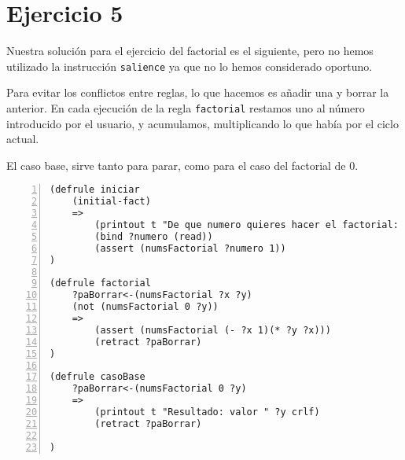\documentclass[12pt]{article}
\begin{document}
\section{Ejercicio 5}
Nuestra soluci\'{o}n para el ejercicio del factorial es el siguiente, pero
no hemos utilizado la instrucci\'{o}n \texttt{salience} ya que no lo hemos
considerado oportuno. 

Para evitar los conflictos entre reglas, lo que hacemos
es a\~{n}adir una y borrar la anterior. En cada ejecuci\'{o}n de la regla
\texttt{factorial} restamos uno al n\'{u}mero introducido por el usuario, y 
acumulamos, multiplicando lo que hab\'{i}a por el ciclo actual.

El caso base, sirve tanto para parar, como para el caso del factorial de 0.
\begin{lstlisting}[breaklines=true, 
numbers=left, showspaces=false]
(defrule iniciar
    (initial-fact)
    =>
        (printout t "De que numero quieres hacer el factorial: ")
        (bind ?numero (read))
        (assert (numsFactorial ?numero 1))
)

(defrule factorial
    ?paBorrar<-(numsFactorial ?x ?y)
    (not (numsFactorial 0 ?y))
    =>
        (assert (numsFactorial (- ?x 1)(* ?y ?x)))
        (retract ?paBorrar)
)

(defrule casoBase
    ?paBorrar<-(numsFactorial 0 ?y)
    =>
        (printout t "Resultado: valor " ?y crlf)
        (retract ?paBorrar)

)
\end{lstlisting}
\end{document}

